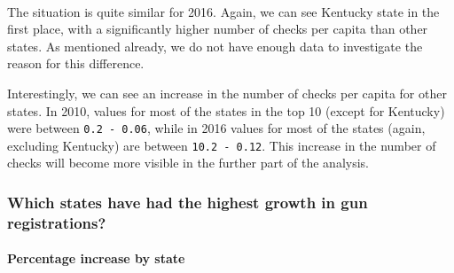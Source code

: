 \documentclass[11pt]{article}
\begin{document}
    \begin{center}
    \end{center}
    { \hspace*{\fill} \\}
    
    The situation is quite similar for 2016. Again, we can see Kentucky
state in the first place, with a significantly higher number of checks
per capita than other states. As mentioned already, we do not have
enough data to investigate the reason for this difference.

Interestingly, we can see an increase in the number of checks per capita
for other states. In 2010, values for most of the states in the top 10
(except for Kentucky) were between \texttt{0.2\ -\ 0.06}, while in 2016
values for most of the states (again, excluding Kentucky) are between
\texttt{10.2\ -\ 0.12}. This increase in the number of checks will
become more visible in the further part of the analysis.

    \hypertarget{which-states-have-had-the-highest-growth-in-gun-registrations}{%
\subsubsection{Which states have had the highest growth in gun
registrations?}\label{which-states-have-had-the-highest-growth-in-gun-registrations}}

    \hypertarget{percentage-increase-by-state}{%
\paragraph{Percentage increase by
state}\label{percentage-increase-by-state}}
\end{document}
